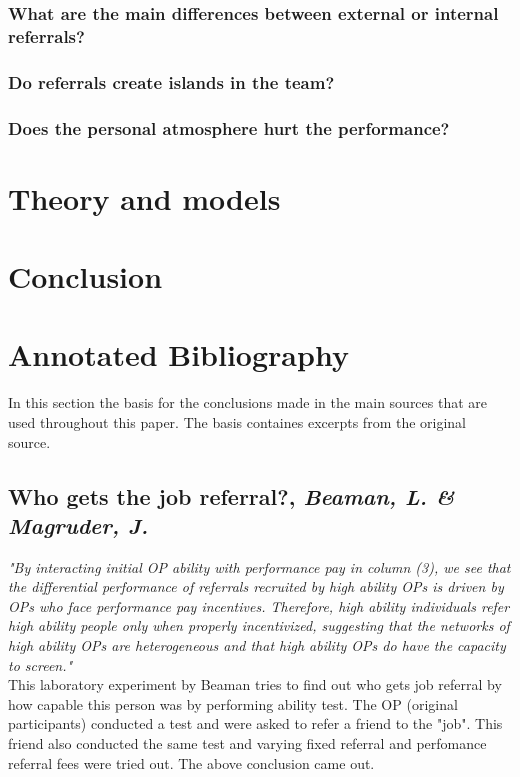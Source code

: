 \documentclass[a4paper, 11pt]{article} %
\begin{document}
\subsubsection*{What are the main differences between external or internal referrals?}
\subsubsection*{Do referrals create islands in the team?}
\subsubsection*{Does the personal atmosphere hurt the performance?}

\section*{Theory and models}

\section*{Conclusion}

\section*{Annotated Bibliography}
In this section the basis for the conclusions made in the main sources that are used throughout this paper. The basis containes excerpts from the original source.

\subsection*{Who gets the job referral?, \emph{Beaman, L. \& Magruder, J.} \cite{first}}

\emph{"By interacting initial OP ability with performance pay in column (3), we see that the differential
performance of referrals recruited by high ability OPs is driven by OPs who face performance
pay incentives. Therefore, high ability individuals refer high ability people only when properly
incentivized, suggesting that the networks of high ability OPs are heterogeneous and that high
ability OPs do have the capacity to screen."}\\

This laboratory experiment by Beaman tries to find out who gets job referral by how capable this person was by performing ability test. The OP (original participants) conducted a test and were asked to refer a friend to the "job". This friend also conducted the same test and varying fixed referral and perfomance referral fees were tried out. The above conclusion came out.
\end{document}
